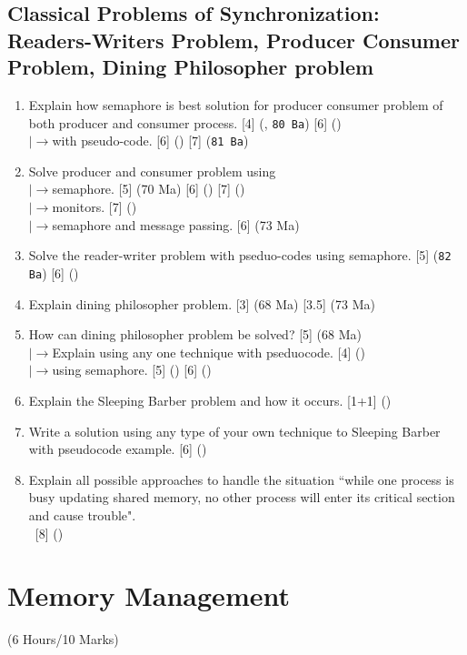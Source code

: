 \documentclass[12pt]{article}
\newcommand{\lb}{\\$\left|\rightarrow\right.$}
\newcommand{\enter}{\\\textcolor{white}{1}}
\begin{document}
	\subsection{Classical Problems of Synchronization: Readers-Writers Problem, Producer Consumer Problem, Dining Philosopher problem}
		\begin{enumerate}[topsep=0pt]
			\item Explain how semaphore is best solution for producer consumer problem of both producer and consumer process. \hfill [4] (, \texttt{80 Ba}) [6] ()
			\lb with pseudo-code. \hfill [6] () [7] (\texttt{81 Ba})
			
			\item Solve producer and consumer problem using 
			\lb semaphore. \hfill [5] (70 Ma) [6] () [7] () 
			\lb monitors. \hfill [7] ()
			\lb semaphore and message passing. \hfill [6] (73 Ma)
			
			\item Solve the reader-writer problem with pseduo-codes using semaphore. \hfill [5] (\texttt{82 Ba}) [6] ()
			
			\item Explain dining philosopher problem. \hfill [3] (68 Ma) [3.5] (73 Ma)
			
			\item How can dining philosopher problem be solved? \hfill [5] (68 Ma)
			\lb Explain using any one technique with pseduocode. \hfill [4] ()
			\lb using semaphore. \hfill [5] () [6] ()
			
			\item Explain the Sleeping Barber problem and how it occurs. \hfill [1+1] ()
			
			\item Write a solution using any type of your own technique to Sleeping Barber with pseudocode example. \hfill [6] ()
			
			\item Explain all possible approaches to handle the situation ``while one process is busy updating shared memory, no other process will enter its critical section and cause trouble".
			\enter\hfill [8] ()
		\end{enumerate}

	\pagebreak

\section{Memory Management}
	\begin{center}(6 Hours/10 Marks)\end{center}
\end{document}
